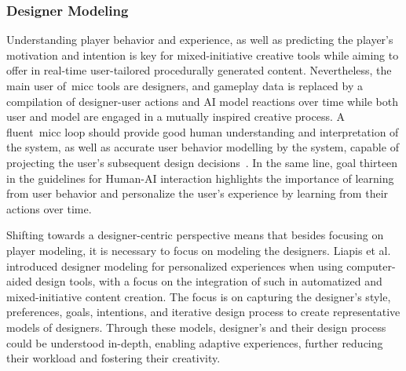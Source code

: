 \subsubsection{Designer Modeling}

Understanding player behavior and experience, as well as predicting the player's motivation and intention is key for mixed-initiative creative tools while aiming to offer in real-time user-tailored procedurally generated content. Nevertheless, the main user of~\acrshort{micc} tools are designers, and gameplay data is replaced by a compilation of designer-user actions and AI model reactions over time while both user and model are engaged in a mutually inspired creative process. A fluent~\acrshort{micc} loop should provide good human understanding and interpretation of the system, as well as accurate user behavior modelling by the system, capable of projecting the user's subsequent design decisions~\cite{ComptonPhD}. In the same line, goal thirteen in the guidelines for Human-AI interaction \cite{amershi2019guidelines} highlights the importance of learning from user behavior and personalize the user’s experience by learning from their actions over time. 

Shifting towards a designer-centric perspective means that besides focusing on player modeling, it is necessary to focus on modeling the designers. Liapis et al.~\cite{Liapis2013-designerModel,Liapis2014-designerModelImpl} introduced designer modeling for personalized experiences when using computer-aided design tools, with a focus on the integration of such in automatized and mixed-initiative content creation. The focus is on capturing the designer's style, preferences, goals, intentions, and iterative design process to create representative models of designers. Through these models, designer's and their design process could be understood in-depth, enabling adaptive experiences, further reducing their workload and fostering their creativity. 


